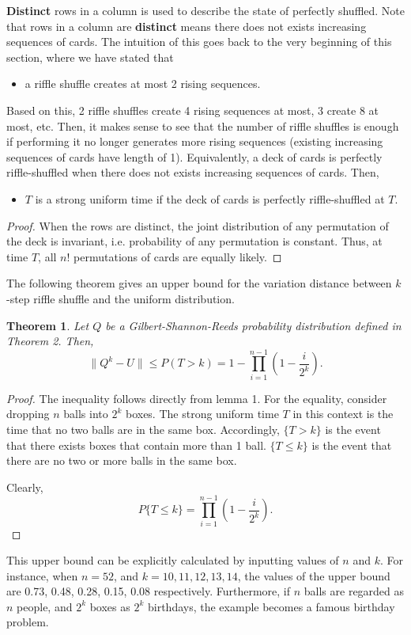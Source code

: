 \documentclass[12pt]{article}
\theoremstyle{plain}
\newtheorem{theorem}{Theorem}
\theoremstyle{definition}
\theoremstyle{remark}
\begin{document}
\textbf{Distinct} rows in a column is used to describe the state of perfectly shuffled. Note that rows in a column are \textbf{distinct} means there does not exists increasing sequences of cards. The intuition of this goes back to the very beginning of this section, where we have stated that 
\begin{itemize}
    \item a riffle shuffle creates at most 2 rising sequences.
\end{itemize}
Based on this, 2 riffle shuffles create 4 rising sequences at most, 3 create 8 at most, etc. Then, it makes sense to see that the number of riffle shuffles is enough if performing it no longer generates more rising sequences (existing increasing sequences of cards have length of 1). Equivalently, a deck of cards is perfectly riffle-shuffled when there does not exists increasing sequences of cards. Then,
\begin{itemize}
    \item $T$ is a strong uniform time if the deck of cards is perfectly riffle-shuffled at $T$.
\end{itemize}

\begin{proof}\cite{1.1}
When the rows are distinct, the joint distribution of any permutation of the deck is invariant, i.e. probability of any permutation is constant. Thus, at time $T$, all $n!$ permutations of cards are equally likely.
\end{proof}

The following theorem gives an upper bound for the variation distance between $k$-step riffle shuffle and the uniform distribution.

\begin{theorem}\cite[Theorem~5 on \pno~344]{1.1}
Let $Q$ be a Gilbert-Shannon-Reeds probability distribution defined in Theorem 2. Then,
\[   \big\|Q^k-U\big\| \leq P(T > k) = 1 - \prod_{i=1}^{n-1}(1-\frac{i}{2^k}).  \]
\end{theorem}

\begin{proof}
The inequality follows directly from lemma 1. For the equality, consider dropping $n$ balls into $2^k$ boxes. The strong uniform time $T$ in this context is the time that no two balls are in the same box.  Accordingly, $\{T>k\}$ is the event that there exists boxes that contain more than 1 ball. $\{T\leq k\}$ is the event that there are no two or more balls in the same box. 

Clearly, $$P\{T\leq k\}=\prod_{i=1}^{n-1}(1-\frac{i}{2^k}).$$
\end{proof}
This upper bound can be explicitly calculated by inputting values of $n$ and $k$. For instance\cite[344]{1.1}, when $n=52$, and $k=10, 11, 12, 13, 14$, the values of the upper bound are 0.73, 0.48, 0.28, 0.15, 0.08 respectively. Furthermore, if $n$ balls are regarded as $n$ people, and $2^k$ boxes as $2^k$ birthdays, the example becomes a famous birthday problem.\cite{1.1}
\end{document}
